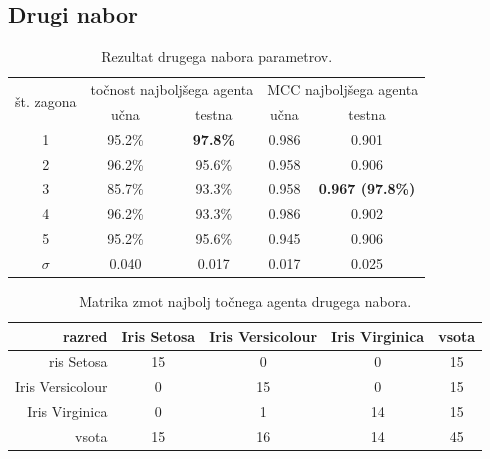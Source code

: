 \subsection{Drugi nabor}\label{subsec:dodatek-iris-drugi-nabor}
\begin{table}[H]
    \begin{center}
        \begin{tabular}{|| c | c c || c c ||}
            \hline
            \multirow{2}{*}{št. zagona} & \multicolumn{2}{c||}{točnost najboljšega agenta} & \multicolumn{2}{c||}{MCC najboljšega agenta} \\ \cline{2-5}
            & učna   & testna          & učna  & testna                  \\
            \hline
            1        & 95.2\% & \textbf{97.8\%} & 0.986 & 0.901                   \\
            \hline
            2        & 96.2\% & 95.6\%          & 0.958 & 0.906                   \\
            \hline
            3        & 85.7\% & 93.3\%          & 0.958 & \textbf{0.967 (97.8\%)} \\
            \hline
            4        & 96.2\% & 93.3\%          & 0.986 & 0.902                   \\
            \hline
            5        & 95.2\% & 95.6\%          & 0.945 & 0.906                   \\
            \hline
            $\sigma$ & 0.040  & 0.017           & 0.017 & 0.025                   \\
            \hline
        \end{tabular}
    \end{center}
    \caption{Rezultat drugega nabora parametrov.}
    \label{tab:iris_result_2}
\end{table}

\begin{table}[H]
    \centering
    \begin{tabular}{||rcccc||}
        \hline
        razred           & Iris Setosa & Iris Versicolour & Iris Virginica & vsota \\ \hline
        ris Setosa       & 15          & 0                & 0              & 15    \\ \hline
        Iris Versicolour & 0           & 15               & 0              & 15    \\ \hline
        Iris Virginica   & 0           & 1                & 14             & 15    \\ \hline
        vsota            & 15          & 16               & 14             & 45    \\ \hline
    \end{tabular}
    \caption{Matrika zmot najbolj točnega agenta drugega nabora.}
    \label{tab:iris_acc_2}
\end{table}

